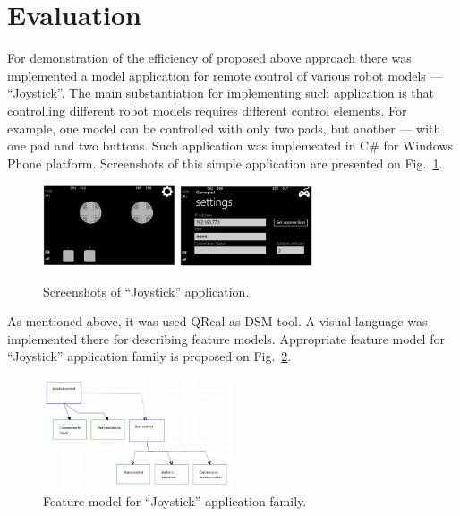 \documentclass[conference]{IEEEtran}
\begin{document}
\section{Evaluation}
\label{chapter:evaluation}
For demonstration of the efficiency of proposed above approach there was implemented a model application for remote control of various robot models --- ``Joystick''. The main substantiation for implementing such application is that controlling different robot models requires different control elements. For example, one model can be controlled with only two pads, but another --- with one pad and two buttons. Such application was implemented in C\# for Windows Phone platform. Screenshots of this simple application are presented on Fig.~\ref{image:joystick}. 

\begin{figure}[t]
	\centering
	\includegraphics[width=0.35\textwidth]{joystick1.png}
	\includegraphics[width=0.35\textwidth]{joystick2.png}
	\caption{Screenshots of ``Joystick'' application.}
	\label{image:joystick}
\end{figure}

As mentioned above, it was used QReal as DSM tool. A visual language was implemented there for describing feature models. Appropriate feature model for ``Joystick'' application family is proposed on Fig.~\ref{image:joystickFeatureModel}.

\begin{figure}[H]
	\centering
	\includegraphics[width=0.5\textwidth]{joystickFeatureModel.png}
	\caption{Feature model for ``Joystick'' application family.}
	\label{image:joystickFeatureModel}
\end{figure}
\end{document}
